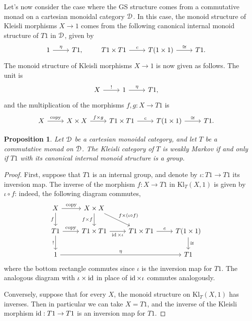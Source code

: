 \documentclass[a4paper,UKenglish,numberwithinsect,cleveref, autoref, thm-restate]{lipics-v2021}
\theoremstyle{plain} %
\newtheorem{myproposition}[mytheorem]{Proposition}
\theoremstyle{definition} %
\begin{document}
Let's now consider the case where the GS structure comes from a commutative monad on a cartesian monoidal category $\mathcal{D}$. 
In this case, the monoid structure of Kleisli morphisms $X\to 1$ comes from the following canonical internal monoid structure of $T1$ in $\mathcal{D}$, given by 
 \[
 \begin{tikzcd}
  1 \ar{r}{\eta} & T1 ,
 \end{tikzcd}
 \qquad
 \begin{tikzcd}
  T1 \times T1 \ar{r}{c} & T(1\times 1) \ar{r}{\cong} & T1 .
 \end{tikzcd}
 \]
 The monoid structure of Kleisli morphisms $X\to 1$ is now given as follows. The unit is
 \[
 \begin{tikzcd}
  X \ar{r}{!} & 1 \ar{r}{\eta} & T1 ,
 \end{tikzcd}
 \]
 and the multiplication of the morphisms $f,g:X\to T1$ is
 \[
 \begin{tikzcd}
  X \ar{r}{\mathrm{copy}} & X\times X \ar{r}{f\times g} &
  T1 \times T1 \ar{r}{c} & T(1\times 1) \ar{r}{\cong} & T1 .
 \end{tikzcd}
 \]
\begin{myproposition}
 Let $\mathcal{D}$ be a cartesian monoidal category, and let $T$ be a commutative monad on $\mathcal{D}$. The Kleisli category of $T$ is weakly Markov if and only if $T1$ with its canonical internal monoid structure is a group.
\end{myproposition}
\begin{proof}
 First, suppose that $T1$ is an internal group, and denote by $\iota:T1\to T1$ its inversion map. 
 The inverse of the morphism $f:X\to T1$ in $\mathrm{Kl}_T(X,1)$ is given by $\iota\circ f$: indeed, the following diagram commutes,
 \[
  \begin{tikzcd}
  X \ar{d}[swap]{f} \ar{r}{\mathrm{copy}} & X\times X \ar{d}[swap]{f\times f} \ar{dr}{f\times(\iota\circ f)} \\
  T1 \ar{d}[swap]{!} \ar{r}{\mathrm{copy}} & T1\times T1 \ar{r}[swap]{\id\times\iota} & T1\times T1 \ar{r}{c} & T(1\times 1) \ar{d}{\cong} \\
  1 \ar{rrr}{\eta} &&& T1
  \end{tikzcd}
 \]
 where the bottom rectangle commutes since $\iota$ is the inversion map for $T1$. The analogous diagram with $\iota\times\operatorname{ id}$ in place of $\operatorname{ id}\times\iota$ commutes analogously.
 
 Conversely, suppose that for every $X$, the monoid structure on $\mathrm{Kl}_T(X,1)$ has inverses. Then in particular we can take $X=T1$, and the inverse of the Kleisli morphism $\operatorname{ id}:T1\to T1$ is an inversion map for $T1$. 
\end{proof}
\end{document}
